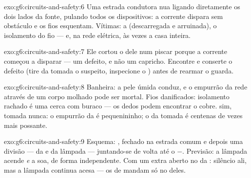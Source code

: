 \begin{solution}{exo:g6:circuits-and-safety:6}
Uma estrada condutora nua ligando diretamente os dois lados da fonte,
pulando todos os dispositivos: a corrente dispara sem obstáculo e os
fios esquentam. Vítimas: a  (descarregada e arruinada), o
isolamento do fio --- e, na rede elétrica, às vezes a casa inteira.
\end{solution}

\begin{solution}{exo:g6:circuits-and-safety:7}
Ele cortou o  dele num piscar porque a corrente começou a
disparar --- um defeito, e não um capricho. Encontre e conserte o
defeito (tire da tomada o suspeito, inspecione o ) antes de
rearmar o guarda.
\end{solution}

\begin{solution}{exo:g6:circuits-and-safety:8}
Banheira: a pele úmida conduz, e o empurrão da rede através de um
corpo molhado pode ser mortal. Fios danificados: isolamento rachado é
uma cerca com buraco --- os dedos podem encontrar o cobre.  sim,
tomada nunca: o empurrão da  é pequenininho; o da tomada é
centenas de vezes mais possante.
\end{solution}

\begin{solution}{exo:g6:circuits-and-safety:9}
Esquema: ,  fechado na estrada comum e depois uma
divisão ---  da  e  da lâmpada --- juntando-se de
volta até o $-$. Previsão: a lâmpada acende \emph{e} a  soa,
de forma independente. Com um  extra aberto no  da
: silêncio ali, mas a lâmpada continua acesa --- os
 de  mandam só no  deles.
\end{solution}

